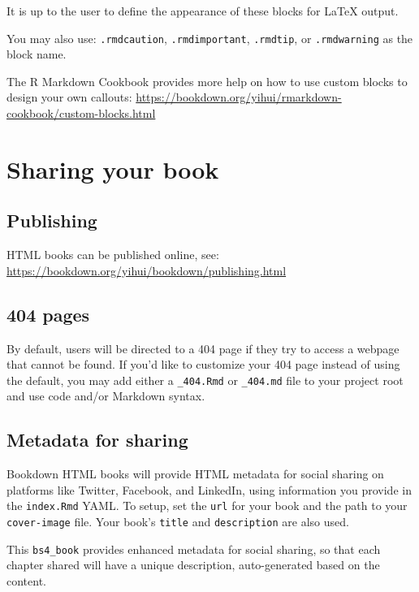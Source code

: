 \documentclass[
]{book}
\theoremstyle{definition}
\theoremstyle{definition}
\theoremstyle{definition}
\theoremstyle{definition}
\theoremstyle{remark}
\begin{document}
It is up to the user to define the appearance of these blocks for LaTeX output.

You may also use: \texttt{.rmdcaution}, \texttt{.rmdimportant}, \texttt{.rmdtip}, or \texttt{.rmdwarning} as the block name.

The R Markdown Cookbook provides more help on how to use custom blocks to design your own callouts: \url{https://bookdown.org/yihui/rmarkdown-cookbook/custom-blocks.html}

\hypertarget{sharing-your-book}{%
\chapter{Sharing your book}\label{sharing-your-book}}

\hypertarget{publishing}{%
\section{Publishing}\label{publishing}}

HTML books can be published online, see: \url{https://bookdown.org/yihui/bookdown/publishing.html}

\hypertarget{pages}{%
\section{404 pages}\label{pages}}

By default, users will be directed to a 404 page if they try to access a webpage that cannot be found. If you'd like to customize your 404 page instead of using the default, you may add either a \texttt{\_404.Rmd} or \texttt{\_404.md} file to your project root and use code and/or Markdown syntax.

\hypertarget{metadata-for-sharing}{%
\section{Metadata for sharing}\label{metadata-for-sharing}}

Bookdown HTML books will provide HTML metadata for social sharing on platforms like Twitter, Facebook, and LinkedIn, using information you provide in the \texttt{index.Rmd} YAML. To setup, set the \texttt{url} for your book and the path to your \texttt{cover-image} file. Your book's \texttt{title} and \texttt{description} are also used.

This \texttt{bs4\_book} provides enhanced metadata for social sharing, so that each chapter shared will have a unique description, auto-generated based on the content.
\end{document}
